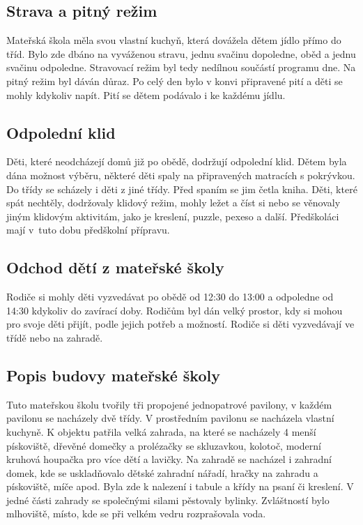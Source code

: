 		\subsection{Strava a pitný režim}
			Mateřská škola měla svou vlastní kuchyň, která dovážela dětem jídlo přímo do tříd. Bylo zde dbáno na vyváženou stravu, jednu svačinu dopoledne, oběd a jednu svačinu odpoledne. Stravovací režim byl tedy nedílnou součástí programu dne. Na pitný režim byl dáván důraz. Po celý den bylo v konvi připravené pití a děti se mohly kdykoliv napít. Pití se dětem podávalo i ke každému jídlu.

		\subsection{Odpolední klid}
			Děti, které neodcházejí domů již po obědě, dodržují odpolední klid. Dětem byla dána možnost výběru, některé děti spaly na připravených matracích s pokrývkou. Do třídy se scházely i děti z jiné třídy. Před spaním se jim četla kniha. Děti, které spát nechtěly, dodržovaly klidový režim, mohly ležet a číst si nebo se věnovaly jiným klidovým aktivitám, jako je kreslení, puzzle, pexeso a další. Předškoláci mají v tuto dobu předškolní přípravu. 


		\subsection{Odchod dětí z mateřské školy}
			Rodiče si mohly děti vyzvedávat po obědě od 12:30 do 13:00 a odpoledne od 14:30 kdykoliv do zavírací doby. Rodičům byl dán velký prostor, kdy si mohou pro svoje děti přijít, podle jejich potřeb a možností. Rodiče si děti vyzvedávají ve třídě nebo na zahradě. 

		\subsection{Popis budovy mateřské školy}

			Tuto mateřskou školu tvořily tři propojené jednopatrové pavilony, v každém pavilonu se nacházely dvě třídy. V prostředním pavilonu se nacházela vlastní kuchyně. K objektu patřila velká zahrada, na které se nacházely 4 menší pískoviště, dřevěné domečky a prolézačky se skluzavkou, kolotoč, moderní kruhová houpačka pro více dětí a lavičky. Na zahradě se nacházel i zahradní domek, kde se uskladňovalo dětské zahradní nářadí, hračky na zahradu a pískoviště, míče apod. Byla zde k nalezení i tabule a křídy na psaní či kreslení. V jedné části zahrady se společnými silami pěstovaly bylinky. Zvláštností bylo mlhoviště, místo, kde se při velkém vedru rozprašovala voda. 

